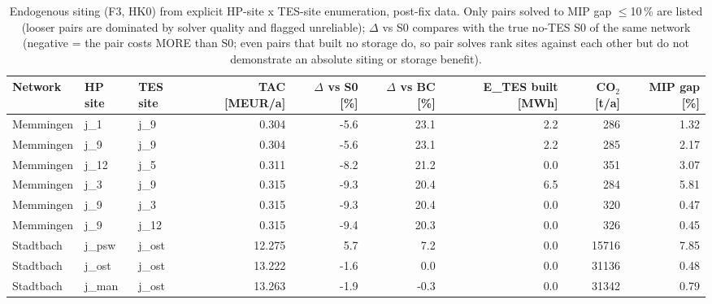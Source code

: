 \begin{table}[htbp]
  \centering
  \caption{Endogenous siting (F3, HK0) from explicit HP-site x TES-site enumeration, post-fix data. Only pairs solved to MIP gap $\leq$10\,\% are listed (looser pairs are dominated by solver quality and flagged unreliable); $\Delta$ vs S0 compares with the true no-TES S0 of the same network (negative = the pair costs MORE than S0; even pairs that built no storage do, so pair solves rank sites against each other but do not demonstrate an absolute siting or storage benefit).}
  \label{tab:t3b_t4b_f3_final}
  \begin{tabular}{lllrrrrrr}
  \toprule
  Network & HP site & TES site & TAC [MEUR/a] & $\Delta$ vs S0 [\%] & $\Delta$ vs BC [\%] & E\_TES built [MWh] & CO$_2$ [t/a] & MIP gap [\%] \\
  \midrule
  Memmingen & j\_1 & j\_9 & 0.304 & -5.6 & 23.1 & 2.2 & 286 & 1.32 \\
  Memmingen & j\_9 & j\_9 & 0.304 & -5.6 & 23.1 & 2.2 & 285 & 2.17 \\
  Memmingen & j\_12 & j\_5 & 0.311 & -8.2 & 21.2 & 0.0 & 351 & 3.07 \\
  Memmingen & j\_3 & j\_9 & 0.315 & -9.3 & 20.4 & 6.5 & 284 & 5.81 \\
  Memmingen & j\_9 & j\_3 & 0.315 & -9.3 & 20.4 & 0.0 & 320 & 0.47 \\
  Memmingen & j\_9 & j\_12 & 0.315 & -9.4 & 20.3 & 0.0 & 326 & 0.45 \\
  Stadtbach & j\_psw & j\_ost & 12.275 & 5.7 & 7.2 & 0.0 & 15716 & 7.85 \\
  Stadtbach & j\_ost & j\_ost & 13.222 & -1.6 & 0.0 & 0.0 & 31136 & 0.48 \\
  Stadtbach & j\_man & j\_ost & 13.263 & -1.9 & -0.3 & 0.0 & 31342 & 0.79 \\
  \bottomrule
  \end{tabular}
\end{table}
